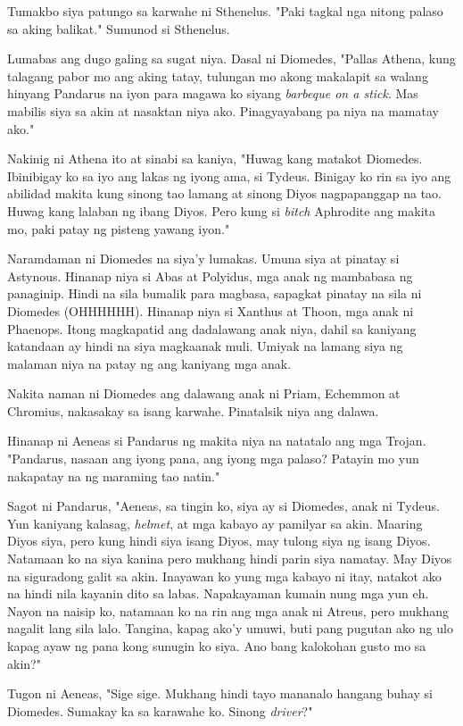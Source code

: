\documentclass[12pt,letterpaper]{report}
\begin{document}
Tumakbo siya patungo sa karwahe ni Sthenelus. "Paki tagkal nga nitong palaso sa aking balikat." Sumunod si Sthenelus.

Lumabas ang dugo galing sa sugat niya. Dasal ni Diomedes, "Pallas Athena, kung talagang pabor mo ang aking tatay, tulungan mo akong makalapit sa walang hinyang Pandarus na iyon para magawa ko siyang \textit{barbeque on a stick}. Mas mabilis siya sa akin at nasaktan niya ako. Pinagyayabang pa niya na mamatay ako."

Nakinig ni Athena ito at sinabi sa kaniya, "Huwag kang matakot Diomedes. Ibinibigay ko sa iyo ang lakas ng iyong ama, si Tydeus. Binigay ko rin sa iyo ang abilidad makita kung sinong tao lamang at sinong Diyos nagpapanggap na tao. Huwag kang lalaban ng ibang Diyos. Pero kung si \textit{bitch} Aphrodite ang makita mo, paki patay ng pisteng yawang iyon."

Naramdaman ni Diomedes na siya'y lumakas. Umuna siya at pinatay si Astynous. Hinanap niya si Abas at Polyidus, mga anak ng mambabasa ng panaginip. Hindi na sila bumalik para magbasa, sapagkat pinatay na sila ni Diomedes (OHHHHHH). Hinanap niya si Xanthus at Thoon, mga anak ni Phaenops. Itong magkapatid ang dadalawang anak niya, dahil sa kaniyang katandaan ay hindi na siya magkaanak muli. Umiyak na lamang siya ng malaman niya na patay ng ang kaniyang mga anak.

Nakita naman ni Diomedes ang dalawang anak ni Priam, Echemmon at Chromius, nakasakay sa isang karwahe. Pinatalsik niya ang dalawa.

Hinanap ni Aeneas si Pandarus ng makita niya na natatalo ang mga Trojan. "Pandarus, nasaan ang iyong pana, ang iyong mga palaso? Patayin mo yun nakapatay na ng maraming tao natin."

Sagot ni Pandarus, "Aeneas, sa tingin ko, siya ay si Diomedes, anak ni Tydeus. Yun kaniyang kalasag, \textit{helmet}, at mga kabayo ay pamilyar sa akin. Maaring Diyos siya, pero kung hindi siya isang Diyos, may tulong siya ng isang Diyos. Natamaan ko na siya kanina pero mukhang hindi parin siya namatay. May Diyos na siguradong galit sa akin. Inayawan ko yung mga kabayo ni itay, natakot ako na hindi nila kayanin dito sa labas. Napakayaman kumain nung mga yun eh. Nayon na naisip ko, natamaan ko na rin ang mga anak ni Atreus, pero mukhang nagalit lang sila lalo. Tangina, kapag ako'y umuwi, buti pang pugutan ako ng ulo kapag ayaw ng pana kong sunugin ko siya. Ano bang kalokohan gusto mo sa akin?"

Tugon ni Aeneas, "Sige sige. Mukhang hindi tayo mananalo hangang buhay si Diomedes. Sumakay ka sa karawahe ko. Sinong \textit{driver}?"
\end{document}
